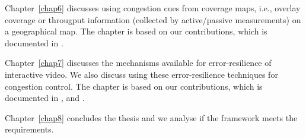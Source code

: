 Chapter~\ref{chap6} discusses using congestion cues from coverage maps, i.e.,
overlay coverage or througput information (collected by active/passive
measurements) on a geographical map. The chapter is based on our
contributions,  which is documented in .


Chapter~\ref{chap7} discusses the mechanisms available for error-resilience of
interactive video. We also discuss using these error-resilience techniques for
congestion control. The chapter is based on our contributions, which is
documented in , and .


Chapter~\ref{chap8} concludes the thesis and we analyse if the framework meets
the requirements.
